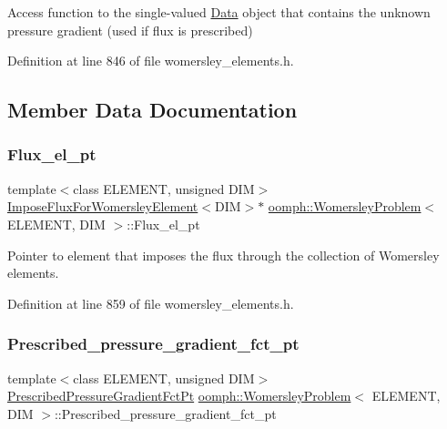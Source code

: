 Access function to the single-\/valued \hyperlink{classoomph_1_1Data}{Data} object that contains the unknown pressure gradient (used if flux is prescribed) 



Definition at line 846 of file womersley\+\_\+elements.\+h.



\subsection{Member Data Documentation}
\mbox{\label{classoomph_1_1WomersleyProblem_a4816844a22263d5f39ff8ca5d2c370ba}} 
\subsubsection{\texorpdfstring{Flux\+\_\+el\+\_\+pt}{Flux\_el\_pt}}
{\footnotesize\ttfamily template$<$class E\+L\+E\+M\+E\+NT, unsigned D\+IM$>$ \\
\hyperlink{classoomph_1_1ImposeFluxForWomersleyElement}{Impose\+Flux\+For\+Womersley\+Element}$<$D\+IM$>$$\ast$ \hyperlink{classoomph_1_1WomersleyProblem}{oomph\+::\+Womersley\+Problem}$<$ E\+L\+E\+M\+E\+NT, D\+IM $>$\+::Flux\+\_\+el\+\_\+pt\hspace{0.3cm}{\ttfamily [private]}}



Pointer to element that imposes the flux through the collection of Womersley elements. 



Definition at line 859 of file womersley\+\_\+elements.\+h.

\mbox{\label{classoomph_1_1WomersleyProblem_a54d5137eeb495e40382576392720611f}} 
\subsubsection{\texorpdfstring{Prescribed\+\_\+pressure\+\_\+gradient\+\_\+fct\+\_\+pt}{Prescribed\_pressure\_gradient\_fct\_pt}}
{\footnotesize\ttfamily template$<$class E\+L\+E\+M\+E\+NT, unsigned D\+IM$>$ \\
\hyperlink{classoomph_1_1WomersleyProblem_ac3607d12a92dede9ed2e93ae64f300b3}{Prescribed\+Pressure\+Gradient\+Fct\+Pt} \hyperlink{classoomph_1_1WomersleyProblem}{oomph\+::\+Womersley\+Problem}$<$ E\+L\+E\+M\+E\+NT, D\+IM $>$\+::Prescribed\+\_\+pressure\+\_\+gradient\+\_\+fct\+\_\+pt\hspace{0.3cm}{\ttfamily [private]}}



